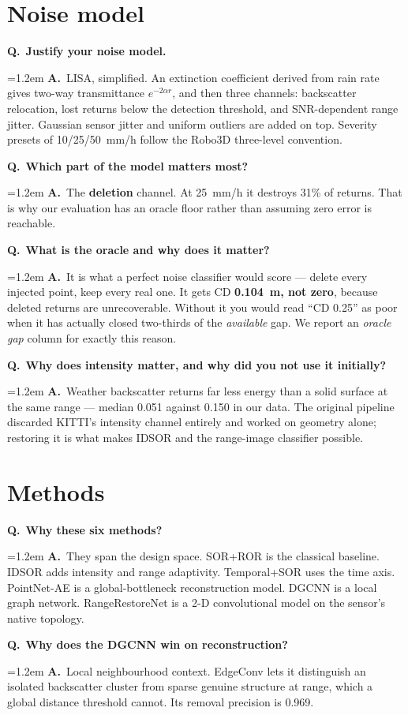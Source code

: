 \documentclass[11pt,a4paper]{article}
\newcommand{\Q}[1]{\medskip\noindent\textcolor{qcol}{\textbf{Q.}}\ \textbf{#1}\par\nopagebreak}
\newcommand{\A}[1]{\noindent\hangindent=1.2em\hangafter=0 \textcolor{inkcol}{\textbf{A.}}\ #1\par}
\begin{document}
\section{Noise model}

\Q{Justify your noise model.}
\A{LISA, simplified. An extinction coefficient derived from rain rate gives
two-way transmittance $e^{-2\alpha r}$, and then three channels: backscatter
relocation, lost returns below the detection threshold, and SNR-dependent
range jitter. Gaussian sensor jitter and uniform outliers are added on top.
Severity presets of 10/25/50~mm/h follow the Robo3D three-level convention.}

\Q{Which part of the model matters most?}
\A{The \textbf{deletion} channel. At 25~mm/h it destroys 31\% of returns.
That is why our evaluation has an oracle floor rather than assuming zero
error is reachable.}

\Q{What is the oracle and why does it matter?}
\A{It is what a perfect noise classifier would score --- delete every
injected point, keep every real one. It gets CD \textbf{0.104~m, not zero},
because deleted returns are unrecoverable. Without it you would read
``CD 0.25'' as poor when it has actually closed two-thirds of the
\emph{available} gap. We report an \emph{oracle gap} column for exactly this
reason.}

\Q{Why does intensity matter, and why did you not use it initially?}
\A{Weather backscatter returns far less energy than a solid surface at the
same range --- median 0.051 against 0.150 in our data. The original pipeline
discarded KITTI's intensity channel entirely and worked on geometry alone;
restoring it is what makes IDSOR and the range-image classifier possible.}

\section{Methods}

\Q{Why these six methods?}
\A{They span the design space. SOR+ROR is the classical baseline. IDSOR adds
intensity and range adaptivity. Temporal+SOR uses the time axis. PointNet-AE
is a global-bottleneck reconstruction model. DGCNN is a local graph network.
RangeRestoreNet is a 2-D convolutional model on the sensor's native topology.}

\Q{Why does the DGCNN win on reconstruction?}
\A{Local neighbourhood context. EdgeConv lets it distinguish an isolated
backscatter cluster from sparse genuine structure at range, which a global
distance threshold cannot. Its removal precision is 0.969.}
\end{document}
